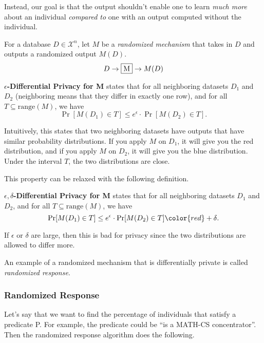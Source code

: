 Instead, our goal is that the output shouldn't enable one to learn \textit{much more} about an individual \textit{compared to} one with an output computed without the individual.

\begin{definition}
    For a database $D \in \mathcal{X}^n$, let $M$ be a \textit{randomized mechanism} that takes in $D$ and outputs a randomized output $M(D)$.
    $$D  \to \fbox{M} \to M(D)$$

    \textbf{$\epsilon$-Differential Privacy for M} states that for all neighboring datasets $D_1$ and $D_2$ (neighboring means that they differ in exactly one row), and for all $T \subseteq \text{range}(M)$, we have
    $$\Pr [M(D_1) \in T] \leq e^{\epsilon} \cdot \Pr[M(D_2) \in T].$$
\end{definition}

Intuitively, this states that two neighboring datasets have outputs that have similar probability distributions. If you apply $M$ on $D_1$, it will give you the red distribution, and if you apply $M$ on $D_2$, it will give you the blue distribution. Under the interval $T$, the two distributions are close.

\begin{center}
    \def\svgwidth{0.5\linewidth}
    
\end{center}

This property can be relaxed with the following definition.

\begin{definition}
    \textbf{$\epsilon, \delta$-Differential Privacy for M} states that for all neighboring datasets $D_1$ and $D_2$, and for all $T \subseteq \text{range}(M)$, we have
    $$\Pr [M(D_1) \in T] \leq e^{\epsilon} \cdot \Pr[M(D_2) \in T] {\color{red} + \delta}.$$

    If $\epsilon$ or $\delta$ are large, then this is bad for privacy since the two distributions are allowed to differ more.
\end{definition}

An example of a randomized mechanism that is differentially private is called \textit{randomized response}.

\subsubsection{Randomized Response}

Let's say that we want to find the percentage of individuals that satisfy a predicate P. For example, the predicate could be ``is a MATH-CS concentrator''. Then the randomized response algorithm does the following.

